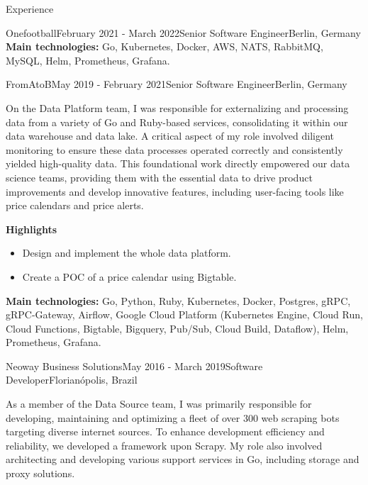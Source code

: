 \documentclass[
	a4paper, %
	10pt, %
]{resume} %
\begin{document}
\begin{rSection}{Experience}
\begin{rSubsection}{Onefootball}{February 2021 - March 2022}{Senior Software Engineer}{Berlin, Germany}
		\textbf{Main technologies:}
			Go, Kubernetes, Docker, AWS, NATS, RabbitMQ, MySQL, Helm, Prometheus, Grafana.

	\end{rSubsection}

	\vspace{1mm}

	\begin{rSubsection}{FromAtoB}{May 2019 - February 2021}{Senior Software Engineer}{Berlin, Germany}
		\item[]

		On the Data Platform team, I was responsible for externalizing and processing data from a variety of Go and Ruby-based services, consolidating it within our data warehouse and data lake.
		A critical aspect of my role involved diligent monitoring to ensure these data processes operated correctly and consistently yielded high-quality data.
		This foundational work directly empowered our data science teams, providing them with the essential data to drive product improvements and develop innovative features, including user-facing tools like price calendars and price alerts.

		\textbf{Highlights}
		\begin{itemize}
			\item Design and implement the whole data platform.
			\item Create a POC of a price calendar using Bigtable.
		\end{itemize}

		\textbf{Main technologies:}
			Go, Python, Ruby, Kubernetes, Docker, Postgres, gRPC, gRPC-Gateway, Airflow, Google Cloud Platform (Kubernetes Engine, Cloud Run, Cloud Functions, Bigtable, Bigquery, Pub/Sub, Cloud Build, Dataflow), Helm, Prometheus, Grafana.

	\end{rSubsection}

	\vspace{1mm}

	\begin{rSubsection}{Neoway Business Solutions}{May 2016 - March 2019}{Software Developer}{Florianópolis, Brazil}
		\item[]
		As a member of the Data Source team, I was primarily responsible for developing, maintaining and optimizing a fleet of over 300 web scraping bots targeting diverse internet sources.
		To enhance development efficiency and reliability, we developed a framework upon Scrapy.
		My role also involved architecting and developing various support services in Go, including storage and proxy solutions.


\end{rSubsection}
\end{rSection}
\end{document}

